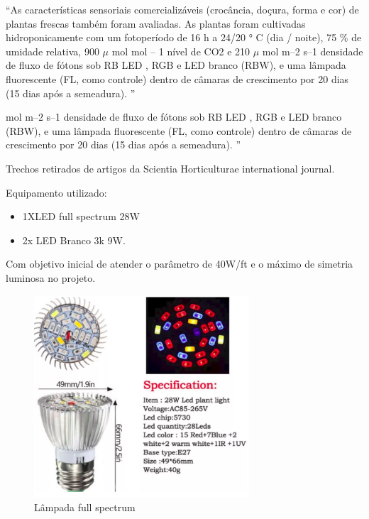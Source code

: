 \begin{center}
	“As características sensoriais comercializáveis (crocância, doçura, forma e cor) de plantas frescas também foram avaliadas. As plantas foram cultivadas hidroponicamente com um fotoperíodo de 16 h a 24/20 ° C (dia / noite), 75 \% de umidade relativa, 900 $\mu$ mol mol -- 1 nível de CO2 e 210 $\mu$ mol m--2 s--1 densidade de fluxo de fótons sob RB LED , RGB e LED branco (RBW), e uma lâmpada fluorescente (FL, como controle) dentro de câmaras de crescimento por 20 dias (15 dias após a semeadura). ”
	
\end{center}
\begin{center}
 mol m--2 s--1 densidade de fluxo de fótons sob RB LED , RGB e LED branco (RBW), e uma lâmpada fluorescente (FL, como controle) dentro de câmaras de crescimento por 20 dias (15 dias após a semeadura). ”
 
\end{center}

Trechos retirados de artigos da Scientia Horticulturae  international journal.

Equipamento utilizado:

\begin{itemize}
	\item 1XLED full spectrum 28W 
	\item 2x LED Branco 3k 9W.
\end{itemize}

Com objetivo inicial de atender o parâmetro de 40W/ft e o máximo de simetria luminosa no projeto.

\begin{figure}[H]
	\centering
	\includegraphics[width=8cm]{figuras/lampada_full.png}
	\caption{Lâmpada full spectrum}
	\label{lampada_full}
\end{figure}

